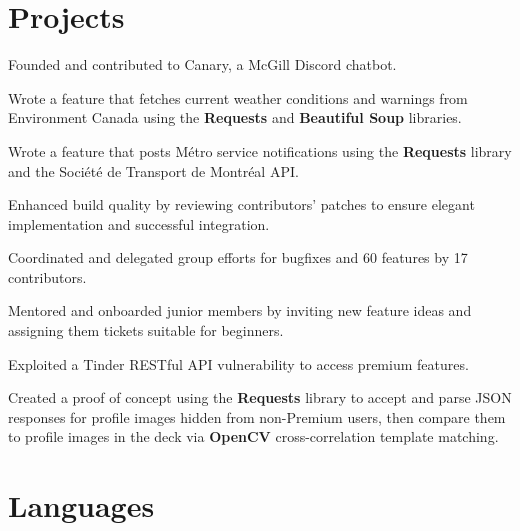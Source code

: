 \documentclass[]{jidicula-resume}
\begin{document}
\newpage
\section{Projects}

\begin{tightemize}
\item Founded and contributed to Canary, a McGill Discord chatbot.
  \item Wrote a feature that fetches current weather conditions and warnings from Environment Canada using the \textbf{Requests} and \textbf{Beautiful Soup} libraries.
  \item Wrote a feature that posts M\'etro service notifications using the \textbf{Requests} library and the Soci\'et\'e de Transport de Montr\'eal API.
  \item Enhanced build quality by reviewing contributors' patches to ensure elegant implementation and successful integration.
  \item Coordinated and delegated group efforts for bugfixes and 60 features by 17 contributors.
  \item Mentored and onboarded junior members by inviting new feature ideas and assigning them tickets suitable for beginners.
\end{tightemize}
\sectionsep{}

\begin{tightemize}
\item Exploited a Tinder RESTful API vulnerability to access premium features.
\item Created a proof of concept using the \textbf{Requests} library to accept and parse JSON responses for profile images hidden from non-Premium users, then compare them to profile images in the deck via \textbf{OpenCV} cross-correlation template matching.
\end{tightemize}
\sectionsep{}

\section{Languages}
\end{document}
